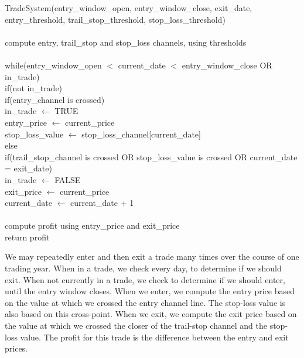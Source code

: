 \documentclass[10pt]{article}
\begin{document}
\setlength{\parindent}{5mm}
\indent TradeSystem(entry\_window\_open, entry\_window\_close, exit\_date,\\
\indent \indent \indent \indent \indent entry\_threshold, trail\_stop\_threshold, stop\_loss\_threshold)\\\\
\indent \indent compute entry, trail\_stop and stop\_loss channels, using thresholds\\\\
\indent \indent while(entry\_window\_open $<$ current\_date $<$ entry\_window\_close OR in\_trade)\\
\indent \indent \indent if(not in\_trade)\\
\indent \indent \indent \indent if(entry\_channel is crossed)\\
\indent \indent \indent \indent \indent in\_trade $\leftarrow$ TRUE\\
\indent \indent \indent \indent \indent entry\_price $\leftarrow$ current\_price\\
\indent \indent \indent \indent \indent stop\_loss\_value $\leftarrow$ stop\_loss\_channel[current\_date]\\
\indent \indent \indent else\\
\indent \indent \indent \indent if(trail\_stop\_channel is crossed OR stop\_loss\_value is crossed OR current\_date = exit\_date)\\
\indent \indent \indent \indent \indent in\_trade $\leftarrow$ FALSE\\
\indent \indent \indent \indent \indent exit\_price $\leftarrow$ current\_price\\
\indent \indent \indent current\_date $\leftarrow$ current\_date + 1\\\\
\indent \indent compute profit using entry\_price and exit\_price\\
\indent \indent return profit\\
\setlength{\parindent}{0mm}

We may repeatedly enter and then exit a trade many times over the course of one
trading year. When in a trade, we check every day, to determine if we should
exit.  When not currently in a trade, we check to determine if we should enter,
until the entry window closes. When we enter, we compute the entry price based
on the value at which we crossed the entry channel line. The stop-loss value is
also based on this cross-point. When we exit, we compute the exit price based on
the value at which we crossed the closer of the trail-stop channel and the
stop-loss value. The profit for this trade is the difference between the entry
and exit prices.
\end{document}
